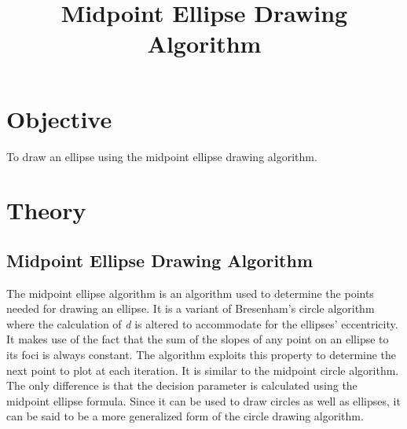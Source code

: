 \documentclass[12pt]{article}
\title{Midpoint Ellipse Drawing Algorithm}
\date{}
\author{}
\begin{document}
	\maketitle
	\vspace{-2cm}

	\section{Objective}
	To draw an ellipse using the midpoint ellipse drawing algorithm.

	\section{Theory}
	
	\subsection{Midpoint Ellipse Drawing Algorithm}
	The midpoint ellipse algorithm is an algorithm used to determine the points needed for drawing an ellipse. It is a variant of Bresenham's circle algorithm where the calculation of \textit{d} is altered to accommodate for the ellipses' eccentricity.
	It makes use of the fact that the sum of the slopes of any point on an ellipse to its foci is always constant. The algorithm exploits this property to determine the next point to plot at each iteration.
	It is similar to the midpoint circle algorithm. The only difference is that the decision parameter is calculated using the midpoint ellipse formula. Since it can be used to draw circles as well as ellipses, it can be said to be a more generalized
	form of the circle drawing algorithm.
\end{document}

